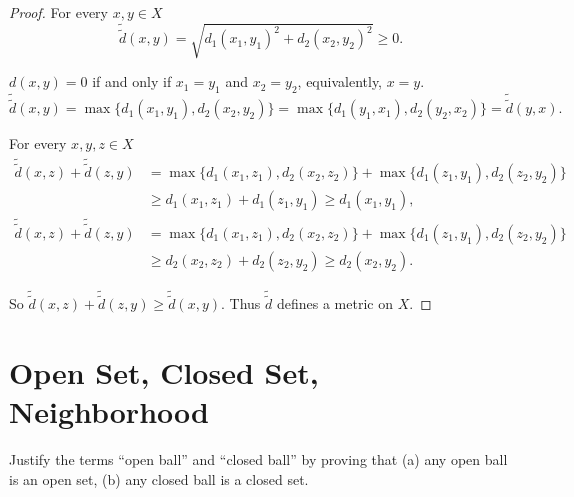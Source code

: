 \begin{proof}
    For every $x, y\in X$
    \[
        \widetilde{\widetilde{d}}(x, y) = \sqrt{{d_{1}(x_{1}, y_{1})}^{2} + {d_{2}(x_{2}, y_{2})}^{2}} \geq 0.
    \]

    $d(x, y) = 0$ if and only if $x_{1} = y_{1}$ and $x_{2} = y_{2}$, equivalently, $x = y$.
    \[
        \widetilde{\widetilde{d}}(x, y) = \max \{d_{1}(x_{1}, y_{1}), d_{2}(x_{2}, y_{2})\} = \max \{d_{1}(y_{1}, x_{1}), d_{2}(y_{2}, x_{2})\} = \widetilde{\widetilde{d}}(y, x).
    \]

    For every $x, y, z\in X$
    \begin{align*}
        \widetilde{\widetilde{d}}(x, z) + \widetilde{\widetilde{d}}(z, y) & = \max \{d_{1}(x_{1}, z_{1}), d_{2}(x_{2}, z_{2})\} + \max \{d_{1}(z_{1}, y_{1}), d_{2}(z_{2}, y_{2})\} \\
                                                                          & \geq d_{1}(x_{1}, z_{1}) + d_{1}(z_{1}, y_{1}) \geq d_{1}(x_{1}, y_{1}),                                \\
        \widetilde{\widetilde{d}}(x, z) + \widetilde{\widetilde{d}}(z, y) & = \max \{d_{1}(x_{1}, z_{1}), d_{2}(x_{2}, z_{2})\} + \max \{d_{1}(z_{1}, y_{1}), d_{2}(z_{2}, y_{2})\} \\
                                                                          & \geq d_{2}(x_{2}, z_{2}) + d_{2}(z_{2}, y_{2}) \geq d_{2}(x_{2}, y_{2}).
    \end{align*}

    So $\widetilde{\widetilde{d}}(x, z) + \widetilde{\widetilde{d}}(z, y) \geq \widetilde{\widetilde{d}}(x, y)$. Thus $\widetilde{\widetilde{d}}$ defines a metric on $X$.
\end{proof}

\section{Open Set, Closed Set, Neighborhood}

\begin{exercise}\label{chapter1:section3:exercise1}
    Justify the terms ``open ball'' and ``closed ball'' by proving that (a) any open ball is an open set, (b) any closed ball is a closed set.
\end{exercise}

